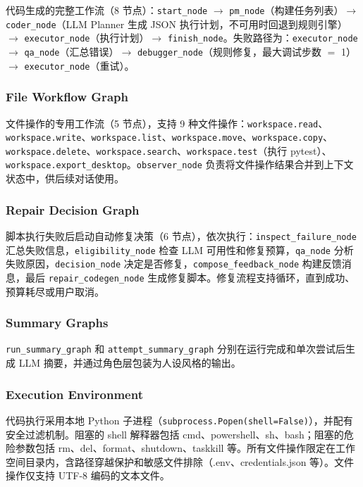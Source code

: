 代码生成的完整工作流（8 节点）：\texttt{start\_node} $\rightarrow$ \texttt{pm\_node}（构建任务列表）$\rightarrow$ \texttt{coder\_node}（LLM Planner 生成 JSON 执行计划，不可用时回退到规则引擎）$\rightarrow$ \texttt{executor\_node}（执行计划）$\rightarrow$ \texttt{finish\_node}。失败路径为：\texttt{executor\_node} $\rightarrow$ \texttt{qa\_node}（汇总错误）$\rightarrow$ \texttt{debugger\_node}（规则修复，最大调试步数 $=$ 1）$\rightarrow$ \texttt{executor\_node}（重试）。

\subsubsection{File Workflow Graph}

文件操作的专用工作流（5 节点），支持 9 种文件操作：\texttt{workspace.read}、\texttt{workspace.write}、\texttt{workspace.list}、\texttt{workspace.move}、\texttt{workspace.copy}、\texttt{workspace.delete}、\texttt{workspace.search}、\texttt{workspace.test}（执行 pytest）、\texttt{workspace.export\_desktop}。\texttt{observer\_node} 负责将文件操作结果合并到上下文状态中，供后续对话使用。

\subsubsection{Repair Decision Graph}

脚本执行失败后启动自动修复决策（6 节点），依次执行：\texttt{inspect\_failure\_node} 汇总失败信息，\texttt{eligibility\_node} 检查 LLM 可用性和修复预算，\texttt{qa\_node} 分析失败原因，\texttt{decision\_node} 决定是否修复，\texttt{compose\_feedback\_node} 构建反馈消息，最后 \texttt{repair\_codegen\_node} 生成修复脚本。修复流程支持循环，直到成功、预算耗尽或用户取消。

\subsubsection{Summary Graphs}

\texttt{run\_summary\_graph} 和 \texttt{attempt\_summary\_graph} 分别在运行完成和单次尝试后生成 LLM 摘要，并通过角色层包装为人设风格的输出。

\subsubsection{Execution Environment}

代码执行采用本地 Python 子进程（\texttt{subprocess.\-Popen(\-shell=False)}），并配有安全过滤机制。阻塞的 shell 解释器包括 cmd、powershell、sh、bash；阻塞的危险参数包括 rm、del、format、shutdown、taskkill 等。所有文件操作限定在工作空间目录内，含路径穿越保护和敏感文件排除（.env、credentials.json 等）。文件操作仅支持 UTF-8 编码的文本文件。

